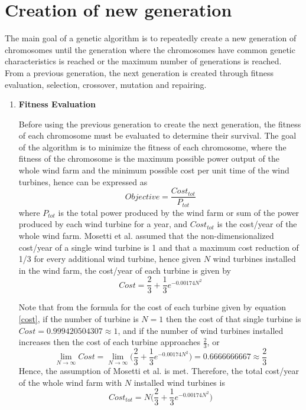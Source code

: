         \section{Creation of new generation}
            \par The main goal of a genetic algorithm is to repeatedly create a new generation of chromosomes until the generation where the chromosomes have common genetic characteristics is reached or the maximum number of generations is reached. From a previous generation, the next generation is created through fitness evaluation, selection, crossover, mutation and repairing.
            \begin{enumerate}
                 \item \textbf{Fitness Evaluation}
                    \par Before using the previous generation to create the next generation, the fitness of each chromosome must be evaluated to determine their survival. The goal of the algorithm is to minimize the fitness of each chromosome, where the fitness of the chromosome is the maximum possible power output of the whole wind farm and the minimum possible cost per unit time of the wind turbines, hence can be expressed as
                    \begin{equation}
                        Objective = \frac{Cost_{tot}}{P_{tot}}
                    \end{equation}
                    where $P_{tot}$ is the total power produced by the wind farm or sum of the power produced by each wind turbine for a year, and $Cost_{tot}$ is the cost/year of the whole wind farm. Mosetti et al. \cite{windturbine5} assumed that the non-dimensionalized cost/year of a single wind turbine is 1 and that a maximum cost reduction of 1/3 for every additional wind turbine, hence given $N$ wind turbines installed in the wind farm, the cost/year of each turbine is given by
                    \begin{equation} \label{cost}
                        Cost = \frac{2}{3} + \frac{1}{3}e^{-0.00174N^2}
                    \end{equation}
                    
                    Note that from the formula for the cost of each turbine given by equation \ref{cost}, if the number of turbine is $N=1$ then the cost of that single turbine is $Cost=0.999420504307\approx 1$, and if the number of wind turbines installed increases then the cost of each turbine approaches $\frac{2}{3}$, or
                    \begin{equation}
                        \lim_{N\to\infty} Cost = \lim_{N\to\infty}\Bigg(\frac{2}{3} + \frac{1}{3}e^{-0.00174N^2}\Bigg)=0.6666666667\approx\frac{2}{3}
                    \end{equation}
                    Hence, the assumption of Mosetti et al. \cite{windturbine5} is met. Therefore, the total cost/year of the whole wind farm with $N$ installed wind turbines is
                    \begin{equation}
                        Cost_{tot} = N\Bigg(\frac{2}{3} + \frac{1}{3}e^{-0.00174N^2}\Bigg)
                    \end{equation}
                    

\end{enumerate}
